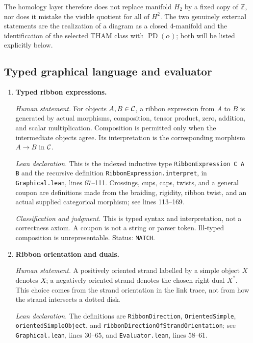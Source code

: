 The homology layer therefore does not replace manifold $H_2$ by a fixed copy
of $\mathbb Z$, nor does it mistake the visible quotient for all of $H^2$.
The two genuinely external statements are the realization of a diagram as a
closed 4-manifold and the identification of the selected THAM class with
$\operatorname{PD}(\alpha)$; both will be listed explicitly below.

\subsection{Typed graphical language and evaluator}
\label{app:lean-graphical-evaluator}

\begin{enumerate}[label=\textbf{E\arabic*.},leftmargin=*]

\item \textbf{Typed ribbon expressions.}

\emph{Human statement.}
For objects $A,B\in\mathcal{C}$, a ribbon expression from $A$ to $B$ is generated by
actual morphisms, composition, tensor product, zero, addition, and scalar
multiplication.  Composition is permitted only when the intermediate objects
agree.  Its interpretation is the corresponding morphism $A\to B$ in $\mathcal{C}$.

\emph{Lean declaration.}
This is the indexed inductive type
\texttt{RibbonExpression C A B} and the recursive definition
\texttt{RibbonExpression.interpret}, in \nolinkurl{Graphical.lean}, lines
67--111.  Crossings, cups, caps, twists, and a general coupon are definitions
made from the braiding, rigidity, ribbon twist, and an actual supplied
categorical morphism; see lines 113--169.

\emph{Classification and judgment.}
This is typed syntax and interpretation, not a correctness axiom.  A coupon is
not a string or parser token.  Ill-typed composition is unrepresentable.
Status: \texttt{MATCH}.

\item \textbf{Ribbon orientation and duals.}

\emph{Human statement.}
A positively oriented strand labelled by a simple object $X$ denotes $X$; a
negatively oriented strand denotes the chosen right dual $X^*$.  This choice
comes from the strand orientation in the link trace, not from how the strand
intersects a dotted disk.

\emph{Lean declaration.}
The definitions are \nolinkurl{RibbonDirection}, \nolinkurl{OrientedSimple},
\nolinkurl{orientedSimpleObject}, and
\nolinkurl{ribbonDirectionOfStrandOrientation}; see
\nolinkurl{Graphical.lean}, lines 30--65, and
\nolinkurl{Evaluator.lean}, lines 58--61.


\end{enumerate}
